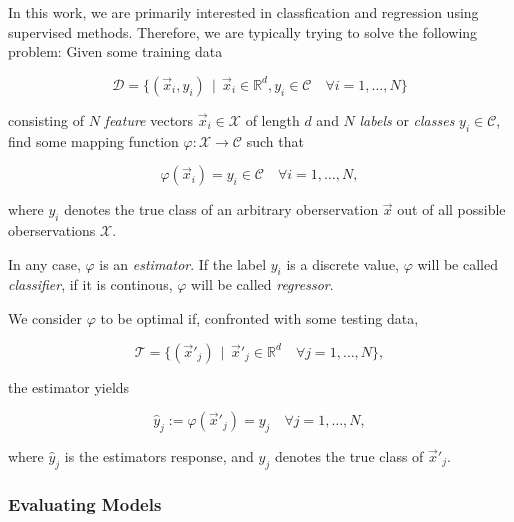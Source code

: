 In this work, we are primarily interested in classfication and regression using supervised methods. Therefore, we are typically trying to solve the following problem: Given some training data

\begin{equation}
\mathcal{D} = \{ (\vec x_i, y_i) \, \mid \, \vec x_i \in \mathbb{R}^d, y_i \in \mathcal{C} \quad \forall i = 1,\ldots,N \}
\end{equation}

consisting of $N$ \emph{feature} vectors $\vec x_i \in \mathcal{X}$ of length $d$ and $N$ \emph{labels} or \emph{classes} $y_i \in \mathcal{C}$, find some mapping function $\varphi \colon \mathcal{X} \to \mathcal{C}$ such that

\begin{equation}
\varphi(\vec x_i) = y_i \in \mathcal{C} \quad \forall i = 1,\ldots,N,
\end{equation}

where $y_i$ denotes the true class of an arbitrary oberservation $\vec x$ out of all possible oberservations $\mathcal{X}$.

\begin{definition}[Estimators]
In any case, $\varphi$ is an \emph{estimator}. If the label $y_i$ is a discrete value, $\varphi$ will be called \emph{classifier}, if it is continous, $\varphi$ will be called \emph{regressor}.
\end{definition}

We consider $\varphi$ to be optimal if, confronted with some testing data,

\begin{equation}
\mathcal{T} = \{ (\vec x'_j) \, \mid \, \vec x'_j \in \mathbb{R}^d \quad \forall j = 1,\ldots,N \},
\end{equation}

the estimator yields

\begin{equation}
\hat y_j := \varphi({\vec x'_j}) = y_j \quad \forall j = 1,\ldots,N,
\end{equation}

where $\hat y_j$ is the estimators response, and $y_j$ denotes the true class of $\vec x'_j$.

\subsubsection{Evaluating Models}


